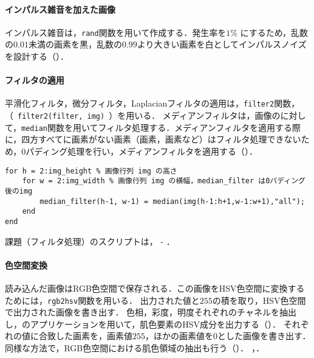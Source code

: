 \paragraph{インパルス雑音を加えた画像}
インパルス雑音は，\texttt{rand}関数を用いて作成する．発生率を\(1\%\) にするため，乱数の\(0.01\)未満の画素を黒，乱数の\(0.99\)より大きい画素を白としてインパルスノイズを設計する（）．
\paragraph{フィルタの適用}
平滑化フィルタ，微分フィルタ，Laplacianフィルタの適用は，\texttt{filter2}関数，（\ \verb|filter2(filter, img)|\ ）を用いる．
メディアンフィルタは，画像のに対して，\texttt{median}関数を用いてフィルタ処理する．メディアンフィルタを適用する際に，四方すべてに画素がない画素（画素，画素など）はフィルタ処理できないため，0パディング処理を行い，メディアンフィルタを適用する（）．
\begin{lstlisting}[caption={メディアンフィルタの適用},label={src:メディアンフィルタの適用},frame={left}]
for h = 2:img_height % 画像行列 img の高さ
    for w = 2:img_width % 画像行列 img の横幅，median_filter は0パディング後のimg
        median_filter(h-1, w-1) = median(img(h-1:h+1,w-1:w+1),"all"); 
    end
end
\end{lstlisting}
課題（フィルタ処理）のスクリプトは， - ．
\paragraph{色空間変換}
読み込んだ画像はRGB色空間で保存される．この画像をHSV色空間に変換するためには，\texttt{rgb2hsv}関数を用いる．
出力された値と\(255\)の積を取り，HSV色空間で出力された画像を書き出す．
色相，彩度，明度それぞれのチャネルを抽出し，\matlab のアプリケーションを用いて，肌色要素のHSV成分を出力する（）．
それぞれの値に合致した画素を，画素値\(255\)，ほかの画素値を\(0\)とした画像を書き出す．同様な方法で，RGB色空間における肌色領域の抽出も行う（）．
\scall{\kadaibe}，．
